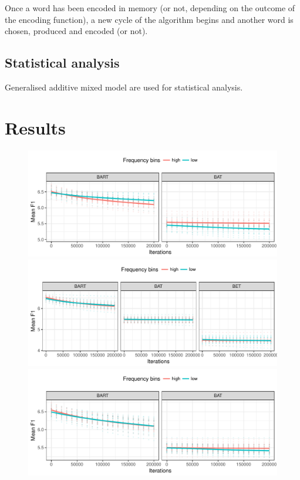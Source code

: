 \documentclass[article, a4paper, 12pt, ]{memoir}
\begin{document}
Once a word has been encoded in memory (or not, depending on the outcome
of the encoding function), a new cycle of the algorithm begins and
another word is chosen, produced and encoded (or not).

\subsection{Statistical analysis}\label{statistical-analysis}

Generalised additive mixed model are used for statistical analysis.

\section{Results}\label{results}

\begin{figure}
\includegraphics{../../figures/plot_1.pdf}
\includegraphics{../../figures/plot_2.pdf}
\includegraphics{../../figures/plot_3.pdf}

\end{figure}
\end{document}

